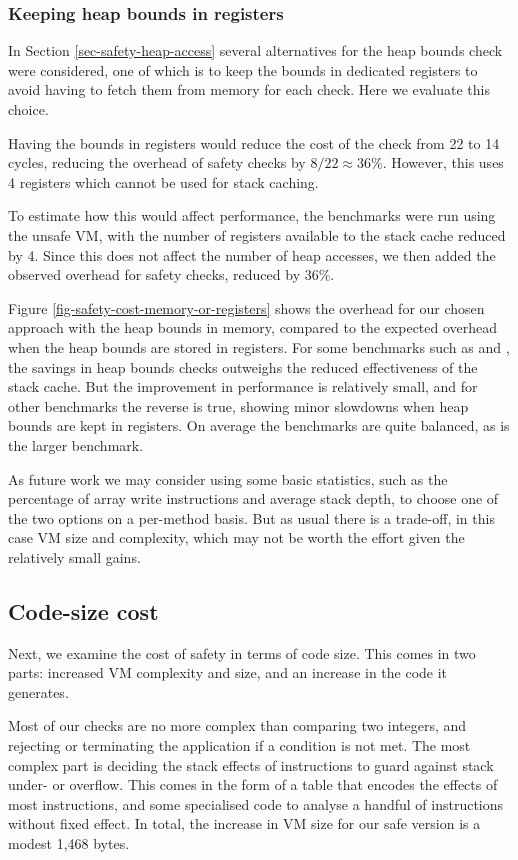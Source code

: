 \subsubsection{Keeping heap bounds in registers}
In Section \ref{sec-safety-heap-access} several alternatives for the heap bounds check were considered, one of which is to keep the bounds in dedicated registers to avoid having to fetch them from memory for each check. Here we evaluate this choice.

Having the bounds in registers would reduce the cost of the check from 22 to 14 cycles, reducing the overhead of safety checks by $8/22 \approx 36\%$. However, this uses 4 registers which cannot be used for stack caching.

To estimate how this would affect performance, the benchmarks were run using the unsafe VM, with the number of registers available to the stack cache reduced by 4. Since this does not affect the number of heap accesses, we then added the observed overhead for safety checks, reduced by 36\%.

Figure \ref{fig-safety-cost-memory-or-registers} shows the overhead for our chosen approach with the heap bounds in memory, compared to the expected overhead when the heap bounds are stored in registers. For some benchmarks such as  and , the savings in heap bounds checks outweighs the reduced effectiveness of the stack cache. But the improvement in performance is relatively small, and for other benchmarks the reverse is true, showing minor slowdowns when heap bounds are kept in registers. On average the benchmarks are quite balanced, as is the larger  benchmark.

As future work we may consider using some basic statistics, such as the percentage of array write instructions and average stack depth, to choose one of the two options on a per-method basis. But as usual there is a trade-off, in this case VM size and complexity, which may not be worth the effort given the relatively small gains.

\subsection{Code-size cost}
Next, we examine the cost of safety in terms of code size. This comes in two parts: increased VM complexity and size, and an increase in the code it generates.

Most of our checks are no more complex than comparing two integers, and rejecting or terminating the application if a condition is not met. The most complex part is deciding the stack effects of instructions to guard against stack under- or overflow. This comes in the form of a table that encodes the effects of most instructions, and some specialised code to analyse a handful of instructions without fixed effect. In total, the increase in VM size for our safe version is a modest 1,468 bytes.

